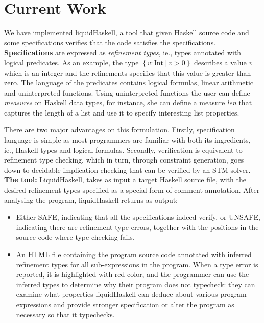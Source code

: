 \section*{Current Work}
We have implemented liquidHaskell, a tool that given Haskell source code 
and some specifications 
verifies that the code
satisfies the specifications.\\

\textbf{Specifications}
are expressed as \textit{refinement types}, ie., types annotated with logical predicates.
As an example, the type $\left\lbrace v : \text{Int}\ |\ v > 0 \right\rbrace $ 
describes a value $v$ which is an integer 
and the refinements specifies that this value is greater than zero.
%
The language of the predicates contains logical formulas, linear arithmetic and uninterpreted functions. 
%
Using uninterpreted functions the user can define \textit{measures} on Haskell data types, 
for instance, she can define a measure \textit{len} that captures the length of a list 
and use it to specify interesting list properties.

There are two major advantages on this formulation.
%
Firstly, specification language is simple
as most programmers are familiar with both
its ingredients, ie., Haskell types and logical formulas.
%
Secondly, verification is equivalent to refinement type checking,
which in turn, through constraint generation, goes down to 
decidable implication checking
that can be verified by an STM solver.
\\

\textbf{The tool:}
LiquidHaskell, takes as input
a target Haskell source file, with the desired refinement types specified as a special
form of comment annotation.
%
After analysing the program, liquidHaskell returns as output:

\begin{itemize}
\item
Either SAFE, indicating that all the specifications indeed verify, 
or UNSAFE, indicating there are refinement type errors, together with the positions in the source
code where type checking fails.
\item
An HTML file containing the program source code annotated with inferred refinement types for all sub-expressions in the program. 
When a type error is reported,  it is highlighted with red color, and the programmer can use the inferred
types to determine why their program does not typecheck: they can examine what
properties liquidHaskell can deduce about various program expressions and 
provide stronger specification or alter the program as necessary so that it typechecks.
\end{itemize}


